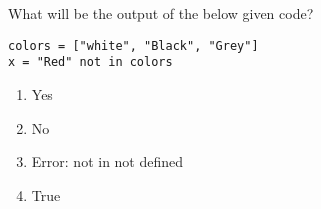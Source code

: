 \question
What will be the output of the below given code?

\begin{lstlisting}
colors = ["white", "Black", "Grey"]
x = "Red" not in colors
\end{lstlisting}
\begin{enumerate}
\item Yes
\item No
\item Error: not in not defined
\item True
\end{enumerate}

